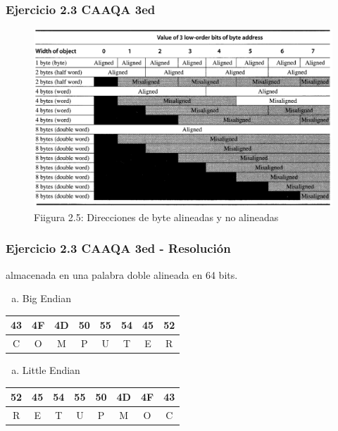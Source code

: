 \documentclass{beamer}
\begin{document}
\begin{frame}
 \frametitle{Ejercicio 2.3 CAAQA 3ed}
 \begin{center}
 \begin{figure}
 \includegraphics[scale=.35,keepaspectratio=true]{align.png}
 \caption*{Fiigura 2.5: Direcciones de byte alineadas y no alineadas} %

 \end{figure}

\end{center}
 \end{frame}
 
\begin{frame}
 \frametitle{Ejercicio 2.3 CAAQA 3ed - Resolución}
 
   almacenada en una palabra doble alineada en 64 bits.

 \begin{enumerate}[a.]
  \item Big Endian
   \end{enumerate}

\begin{center}
  \begin{tabular}{| c | c | c | c | c | c | c | c | }
    \hline
    43 & 4F & 4D & 50 &55 & 54 & 45 & 52 \\ \hline
    C & O & M & P & U & T & E & R \\ \hline
  \end{tabular}
\end{center}

 \begin{enumerate}[b.]
  \item Little Endian
   \end{enumerate}
  
  \begin{center}
  \begin{tabular}{| c | c | c | c | c | c | c | c | }
    \hline
    52 & 45 & 54 & 55 & 50 & 4D & 4F & 43 \\ \hline
     R & E & T & U & P & M & O & C \\ \hline
  \end{tabular}
\end{center}
   
 \end{frame}
\end{document}
